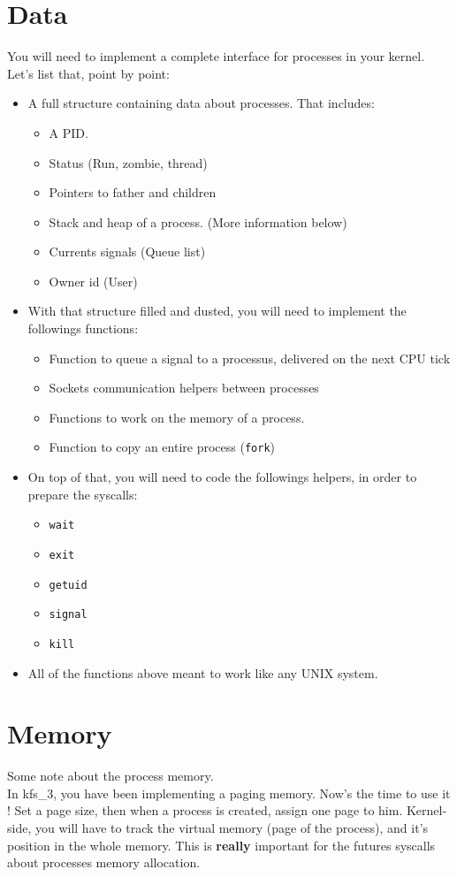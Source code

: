 \documentclass{42-en}
\begin{document}
	\section{Data}
	You will need to implement a complete interface for processes in your kernel.\\
	Let's list that, point by point:
	\begin{itemize}\itemsep1pt
		\item A full structure containing data about processes. That includes:
		\begin{itemize}\itemsep1pt
			\item A PID.
			\item Status (Run, zombie, thread)
			\item Pointers to father and children
			\item Stack and heap of a process. (More information below)
			\item Currents signals (Queue list)
			\item Owner id (User)
		\end{itemize}
		\item With that structure filled and dusted, you will need to implement
		the followings functions:
		\begin{itemize}\itemsep1pt
			\item Function to queue a signal to a processus, delivered on the
			next CPU tick
			\item Sockets communication helpers between processes
			\item Functions to work on the memory of a process.
			\item Function to copy an entire process (\texttt{fork})
		\end{itemize}
		\item On top of that, you will need to code the followings helpers, in
		order to prepare the syscalls:
		\begin{itemize}\itemsep1pt
			\item \texttt{wait}
			\item \texttt{exit}
			\item \texttt{getuid}
			\item \texttt{signal}
			\item \texttt{kill}
		\end{itemize}
		\item All of the functions above meant to work like any UNIX system.
	\end{itemize}
	\section{Memory}
	Some note about the process memory.\\
	In kfs\_3, you have been implementing a paging memory. Now's the time to use it !
	Set a page size, then when a process is created, assign one page to him.
	Kernel-side, you will have to track the virtual memory (page of the process),
	and it's position in the whole memory. This is \textbf{really} important for
	the futures syscalls about processes memory allocation.
\end{document}
